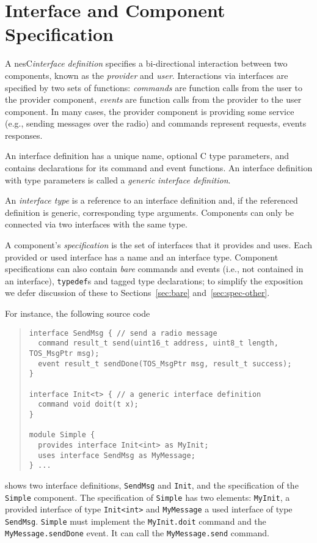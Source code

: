 \documentclass[11pt,letterpaper]{article}
\newcommand{\kw}[1]{{\tt #1}}
\newcommand{\code}[1]{{\tt #1}}
\newcommand{\nesc}{nesC\xspace}
\begin{document}
\section{Interface and Component Specification}
\label{sec:interface}

A \nesc \emph{interface definition} specifies a bi-directional interaction
between two components, known as the \emph{provider} and
\emph{user}. Interactions via interfaces are specified by two sets of
functions: \emph{commands} are function calls from the user to the provider
component, \emph{events} are function calls from the provider to the user
component. In many cases, the provider component is providing some service
(e.g., sending messages over the radio) and commands represent requests,
events responses.

An interface definition has a unique name, optional C type parameters, and
contains declarations for its command and event functions. An interface
definition with type parameters is called a \emph{generic interface
definition}.

An \emph{interface type} is a reference to an interface definition and, if
the referenced definition is generic, corresponding type
arguments. Components can only be connected via two interfaces with the
same type.

A component's \emph{specification} is the set of interfaces that it
provides and uses. Each provided or used interface has a name and an
interface type. Component specifications can also contain \emph{bare}
commands and events (i.e., not contained in an interface), \kw{typedef}s
and tagged type declarations; to simplify the exposition we defer
discussion of these to Sections~\ref{sec:bare} and~\ref{sec:spec-other}.

For instance, the following source code
\begin{quote} \begin{verbatim}
interface SendMsg { // send a radio message
  command result_t send(uint16_t address, uint8_t length, TOS_MsgPtr msg);
  event result_t sendDone(TOS_MsgPtr msg, result_t success);
}

interface Init<t> { // a generic interface definition
  command void doit(t x);
}

module Simple {
  provides interface Init<int> as MyInit;
  uses interface SendMsg as MyMessage;
} ...
\end{verbatim} \end{quote}
shows two interface definitions, \code{SendMsg} and \code{Init}, and the
specification of the \code{Simple} component. The specification of
\code{Simple} has two elements: \code{MyInit}, a provided interface of type
\code{Init<int>} and \code{MyMessage} a used interface of type
\code{SendMsg}. \code{Simple} must implement the \code{MyInit.doit} command
and the \code{MyMessage.sendDone} event. It can call the
\code{MyMessage.send} command.
\end{document}
